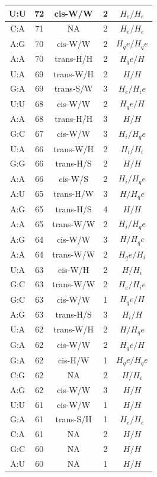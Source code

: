 \begin{center}
\begin{longtable}{c|c|c|c|c}
U:U & 72 & cis-W/W & 2 & $H_e/H_e$ \\  \hline
C:A & 71 & NA & 2 & $H_e/H_e$ \\  \hline
A:G & 70 & cis-W/W & 2 & $H_qe/H_qe$ \\  \hline
A:A & 70 & trans-H/H & 2 & $H_qe/H$ \\  \hline
U:A & 69 & trans-W/H & 2 & $H/H$ \\  \hline
G:A & 69 & trans-S/W & 3 & $H_e/H_ie$ \\  \hline
U:U & 68 & cis-W/W & 2 & $H_qe/H$ \\  \hline
A:A & 68 & trans-H/H & 3 & $H/H$ \\  \hline
G:C & 67 & cis-W/W & 3 & $H_i/H_qe$ \\  \hline
U:A & 66 & trans-W/H & 2 & $H_i/H_i$ \\  \hline
G:G & 66 & trans-H/S & 2 & $H/H$ \\  \hline
A:A & 66 & cis-W/S & 2 & $H_i/H_qe$ \\  \hline
A:U & 65 & trans-H/W & 3 & $H/H_qe$ \\  \hline
A:G & 65 & trans-H/S & 4 & $H/H$ \\  \hline
A:A & 65 & trans-W/W & 2 & $H_i/H_qe$ \\  \hline
A:G & 64 & cis-W/W & 3 & $H/H_qe$ \\  \hline
A:A & 64 & trans-W/W & 2 & $H_qe/H_i$ \\  \hline
U:A & 63 & cis-W/H & 2 & $H/H_i$ \\  \hline
G:C & 63 & trans-W/W & 2 & $H_e/H_ie$ \\  \hline
G:C & 63 & cis-W/W & 1 & $H_qe/H$ \\  \hline
A:G & 63 & trans-H/S & 3 & $H_i/H$ \\  \hline
U:A & 62 & trans-W/H & 2 & $H/H_qe$ \\  \hline
G:A & 62 & cis-W/W & 2 & $H_qe/H$ \\  \hline
G:A & 62 & cis-H/W & 1 & $H_qe/H_qe$ \\  \hline
C:G & 62 & NA & 2 & $H/H_i$ \\  \hline
A:G & 62 & cis-W/W & 3 & $H/H$ \\  \hline
U:U & 61 & cis-W/W & 1 & $H/H$ \\  \hline
G:A & 61 & trans-S/H & 1 & $H_e/H_e$ \\  \hline
C:A & 61 & NA & 2 & $H/H$ \\  \hline
G:C & 60 & NA & 2 & $H/H$ \\  \hline
A:U & 60 & NA & 1 & $H/H$ \\  \hline

\end{longtable}
\end{center}
